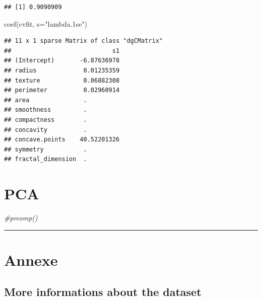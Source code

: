 \documentclass[
  11pt,
]{article}
\newenvironment{Shaded}{\begin{snugshade}}{\end{snugshade}}
\newcommand{\AttributeTok}[1]{\textcolor[rgb]{0.77,0.63,0.00}{#1}}
\newcommand{\CommentTok}[1]{\textcolor[rgb]{0.56,0.35,0.01}{\textit{#1}}}
\newcommand{\DecValTok}[1]{\textcolor[rgb]{0.00,0.00,0.81}{#1}}
\newcommand{\FunctionTok}[1]{\textcolor[rgb]{0.00,0.00,0.00}{#1}}
\newcommand{\NormalTok}[1]{#1}
\newcommand{\SpecialCharTok}[1]{\textcolor[rgb]{0.00,0.00,0.00}{#1}}
\newcommand{\StringTok}[1]{\textcolor[rgb]{0.31,0.60,0.02}{#1}}
\begin{document}
\begin{Shaded}
\end{Shaded}

\begin{verbatim}
## [1] 0.9090909
\end{verbatim}

\begin{Shaded}
\begin{Highlighting}[]
\FunctionTok{coef}\NormalTok{(cvfit, }\AttributeTok{s=}\StringTok{"lambda.1se"}\NormalTok{)}
\end{Highlighting}
\end{Shaded}

\begin{verbatim}
## 11 x 1 sparse Matrix of class "dgCMatrix"
##                            s1
## (Intercept)       -6.87636978
## radius             0.01235359
## texture            0.06882308
## perimeter          0.02960914
## area               .         
## smoothness         .         
## compactness        .         
## concavity          .         
## concave.points    40.52201326
## symmetry           .         
## fractal_dimension  .
\end{verbatim}

\hypertarget{pca}{%
\section{PCA}\label{pca}}

\begin{Shaded}
\begin{Highlighting}[]
\CommentTok{\#prcomp()}
\end{Highlighting}
\end{Shaded}

\begin{center}\rule{0.5\linewidth}{0.5pt}\end{center}

\hypertarget{annexe}{%
\section{Annexe}\label{annexe}}

\hypertarget{more-informations-about-the-dataset}{%
\subsection{More informations about the
dataset}\label{more-informations-about-the-dataset}}
\end{document}
